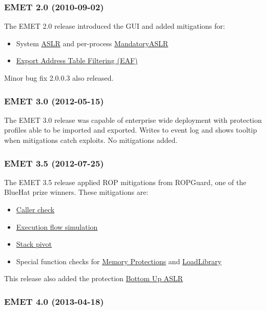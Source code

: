 \documentclass[]{article}
\begin{document}
\subsubsection{EMET 2.0 (2010-09-02)}\label{emet-2.0-2010-09-02}

The EMET 2.0 release\cite{emet2_0} introduced the GUI and added mitigations
for:

\begin{itemize}
\item
  System \hyperref[system_aslr]{ASLR} and per-process
  \hyperref[mandatoryaslr]{MandatoryASLR}
\item
  \hyperref[eaf]{Export Address Table Filtering (EAF)}
\end{itemize}

Minor bug fix 2.0.0.3 also released\cite{emet2_0_0_3}.

\subsubsection{EMET 3.0 (2012-05-15)}\label{emet-3.0-2012-05-15}

The EMET 3.0 release\cite{emet3_0} was capable of enterprise wide deployment
with protection profiles able to be imported and exported. 
Writes to event log and shows tooltip when mitigations catch exploits. 
No mitigations added.

\subsubsection{EMET 3.5 (2012-07-25)}\label{emet-3.5-2012-07-25}

The EMET 3.5 release\cite{emet3_5} applied ROP mitigations from ROPGuard, one
of the BlueHat prize winners. These mitigations are:

\begin{itemize}
\item
  \hyperref[caller]{Caller check}
\item
  \hyperref[simexecflow]{Execution flow simulation}
\item
  \hyperref[stackpivot]{Stack pivot}
\item
  Special function checks for \hyperref[memprot]{Memory Protections} and
  \hyperref[loadlib]{LoadLibrary}
\end{itemize}

This release also added the protection \hyperref[bottomupaslr]{Bottom Up ASLR} 

\subsubsection{EMET 4.0 (2013-04-18)}\label{emet-4.0-2013-04-18}
\end{document}
